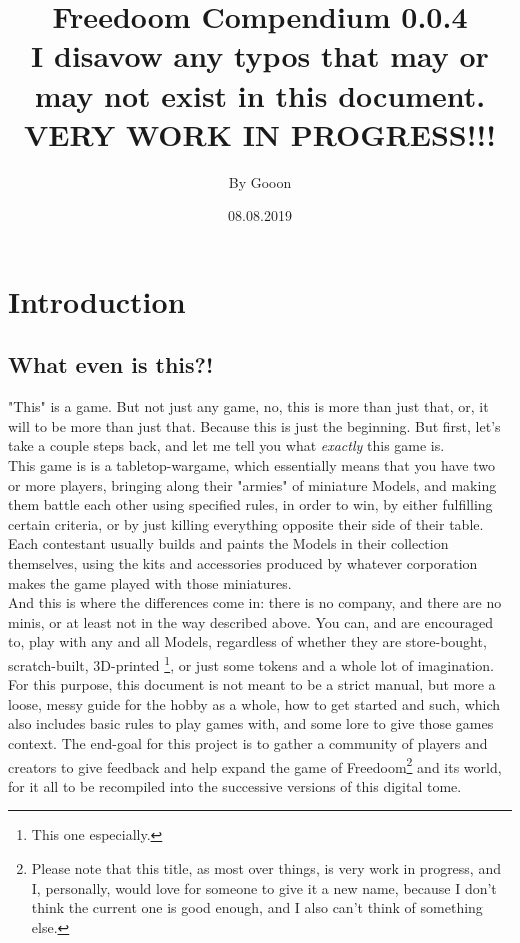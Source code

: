 \documentclass[a4paper,12pt]{book}
\begin{document}
\title{\Large{\textbf{Freedoom Compendium 0.0.4\\ I disavow any typos that may or may not exist in this document.\\ VERY WORK IN PROGRESS!!!}}}
\author{By Gooon}
\date{08.08.2019}

\maketitle
\let\cleardoublepage\clearpage
\tableofcontents
\pagebreak

\chapter{Introduction}
\section{What even is this?!}
"This" is a game. But not just any game, no, this is more than just that, or,  it will to be more than just that. Because this is just the beginning. But first, let's take a couple steps back, and let me tell you what \textit{exactly} this game is. \\
This game is is a tabletop-wargame, which essentially means that you have two or more players, bringing along their "armies" of miniature Models, and making them battle each other using specified rules, in order to win, by either fulfilling certain criteria, or by just killing everything opposite their side of their table. Each contestant usually builds and paints the Models in their collection themselves, using the kits and accessories produced by whatever corporation makes the game played with those miniatures. \\
And this is where the differences come in: there is no company, and there are no minis, or at least not in the way described above. You can, and are encouraged to, play with any and all Models, regardless of whether they are store-bought, scratch-built, 3D-printed \footnote{This one especially.}, or just some tokens and a whole lot of imagination. For this purpose, this document is not meant to be a strict manual, but more a loose, messy guide for the hobby as a whole, how to get started and such, which also includes basic rules to play games with, and some lore to give those games context. The end-goal for this project is to gather a community of players and creators to give feedback and help expand the game of Freedoom\footnote{Please note that this title, as most over things, is very work in progress, and I, personally, would love for someone to give it a new name, because I don't think the current one is good enough, and I also can't think of something else.} and its world, for it all to be recompiled into the successive versions of this digital tome.
\end{document}
